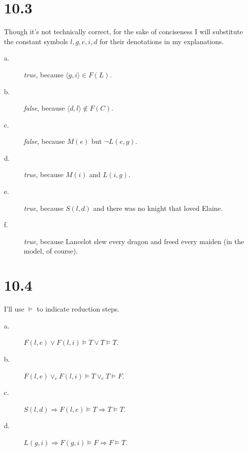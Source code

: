 \documentclass[12pt]{article}
\begin{document}
\section*{10.3}
Though it's not technically correct, for the sake of conciseness I will
substitute the constant symbols $l,g,e,i,d$ for their denotations in my
explanations.
\begin{description}
\item[a.] \textit{true}, because $\langle g,i \rangle \in F(L)$.
\item[b.] \textit{false}, because $\langle d,l \rangle \not\in F(C)$.
\item[c.] \textit{false}, because $M(e)$ but $\neg L(e,g)$.
\item[d.] \textit{true}, because $M(i)$ and $L(i,g)$.
\item[e.] \textit{true}, because $S(l,d)$ and there was no knight that
loved Elaine.
\item[f.] \textit{true}, because Lancelot slew every dragon and freed
every maiden (in the model, of course).
\end{description}

\section*{10.4}
I'll use $\models$ to indicate reduction steps.
\begin{description}
\item[a.] $F(l,e) \vee F(l,i) \models T \vee T \models T$.
\item[b.] $F(l,e) \vee_e F(l,i) \models T \vee_e T \models F$.
\item[c.] $S(l,d) \Rightarrow F(l,e) \models T \Rightarrow T \models T$.
\item[d.] $L(g,i) \Rightarrow F(g,i) \models F \Rightarrow F \models T$.
\end{description}
\end{document}
